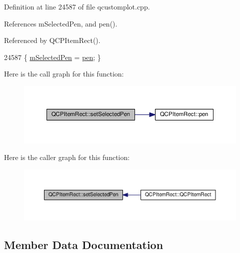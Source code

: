 Definition at line 24587 of file qcustomplot.\+cpp.



References m\+Selected\+Pen, and pen().



Referenced by Q\+C\+P\+Item\+Rect().


\begin{DoxyCode}
24587 \{ \hyperlink{class_q_c_p_item_rect_a73cc0bee61de3c67221ec8c7a76a29ed}{mSelectedPen} = \hyperlink{class_q_c_p_item_rect_a3cb7b6de5e82cc5a3c99e9de919a55e6}{pen}; \}
\end{DoxyCode}


Here is the call graph for this function\+:\nopagebreak
\begin{figure}[H]
\begin{center}
\leavevmode
\includegraphics[width=350pt]{class_q_c_p_item_rect_a52a1bcb2dc753a538e406a2ba3cf21ce_cgraph}
\end{center}
\end{figure}




Here is the caller graph for this function\+:\nopagebreak
\begin{figure}[H]
\begin{center}
\leavevmode
\includegraphics[width=350pt]{class_q_c_p_item_rect_a52a1bcb2dc753a538e406a2ba3cf21ce_icgraph}
\end{center}
\end{figure}




\subsection{Member Data Documentation}
\hypertarget{class_q_c_p_item_rect_a99313bf2b338d9f81e19bd38082038aa}{}
